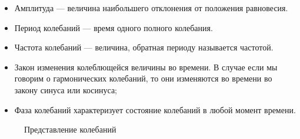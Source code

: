\begin{itemize}
  \item Амплитуда --- величина наибольшего отклонения от положения равновесия.
  \item Период колебаний --- время одного полного колебания.
  \item Частота колебаний --- величина, обратная периоду называется частотой.
  \item Закон изменения колеблющейся величины во времени. В случае если мы
    говорим о гармонических колебаний, то они изменяются во времени во закону
    синуса или косинуса;
  \item Фаза колебаний характеризует состояние колебаний в любой момент
    времени.
\end{itemize}

\begin{figure}[htpb]
  \begin{center}
    \begin{subfigure}{0.45\textwidth}
      \begin{center}
      \end{center}
      \label{fig:graph-view}
    \end{subfigure}
    \begin{subfigure}{0.45\textwidth}
      \begin{center}
      \end{center}
      \label{fig:vector-view}
    \end{subfigure}
    \caption{Представление колебаний}
  \end{center}
\end{figure}

